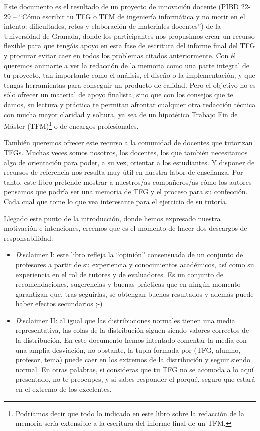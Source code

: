 Este documento es el resultado de un proyecto de innovación docente (PIBD 22-29 -- ``Cómo escribir tu TFG o TFM de ingeniería informática y no morir en el intento: dificultades, retos y elaboración de materiales docentes'') de la Universidad de Granada, donde los participantes nos propusimos crear un recurso flexible para que tengáis apoyo en esta fase de escritura del informe final del TFG y procurar evitar caer en todos los problemas citados anteriormente. Con él queremos animarte a ver la redacción de la memoria como una parte integral de tu proyecto, tan importante como el análisis, el diseño o la implementación, y que tengas herramientas para conseguir un producto de calidad. Pero el objetivo no es sólo ofrecer un material de apoyo finalista, sino que con los consejos que te damos, su lectura y práctica te permitan afrontar cualquier otra redacción técnica con mucha mayor claridad y soltura, ya sea de un hipotético Trabajo Fin de Máster (TFM)\footnote{Podríamos decir que todo lo indicado en este libro sobre la redacción de la memoria sería extensible a la escritura del informe final de un TFM.} o de encargos profesionales.

También queremos ofrecer este recurso a la comunidad de docentes que tutorizan TFGs. Muchas veces somos nosotros, los docentes, los que también necesitamos algo de orientación para poder, a su vez, orientar a los estudiantes. Y disponer de recursos de referencia nos resulta muy útil en nuestra labor de enseñanza. Por tanto, este libro pretende mostrar a nuestros/as compañeros/as cómo los autores pensamos que podría ser una memoria de TFG y el proceso para su confección. Cada cual que tome lo que vea interesante para el ejercicio de su tutoría.

Llegado este punto de la introducción, donde hemos expresado nuestra motivación e intenciones, creemos que es el momento de hacer dos descargos de responsabilidad:

\begin{itemize}
    \item {\textit Disclaimer I}: este libro refleja la ``opinión'' consensuada de un conjunto de profesores a partir de su experiencia y conocimientos académicos, así como su experiencia en el rol de tutores y de evaluadores. Es un conjunto de recomendaciones, sugerencias y buenas prácticas que en ningún momento garantizan que, tras seguirlas, se obtengan buenos resultados y además puede haber efectos secundarios ;-) 

    \item {\textit Disclaimer II}: al igual que las distribuciones normales tienen una media representativa, las colas de la distribución siguen siendo valores correctos de la distribución. En este documento hemos intentado comentar la media con una amplia desviación, no obstante, la tupla formada por (TFG, alumno, profesor, tema) puede caer en los extremos de la distribución y seguir siendo normal. En otras palabras, si consideras que tu TFG no se acomoda a lo aquí presentado, no te preocupes, y si sabes responder el porqué, seguro que estará en el extremo de los excelentes. 
    
\end{itemize}

